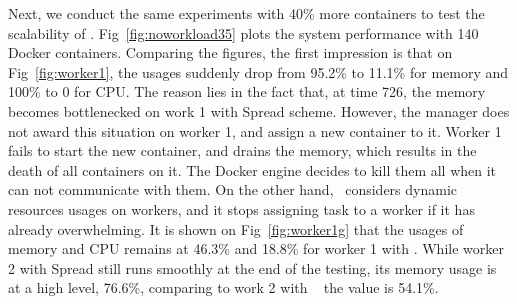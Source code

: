 Next, we conduct the same experiments with 40\% more containers to test the scalability of \sol.
Fig~\ref{fig:noworkload35} plots the system performance with 140 Docker containers. Comparing the figures, the first impression is that
on Fig~\ref{fig:worker1}, the usages suddenly drop from 95.2\% to 11.1\% for memory and 100\% to 0 for CPU.
The reason lies in the fact that, at time 726, the memory becomes bottlenecked on work 1 with Spread scheme.
However, the manager does not award this situation on worker 1, and assign a new container to it. Worker 1 fails to 
start the new container, and drains the memory, which results in the death of all containers on it. The Docker engine
decides to kill them all when it can not communicate with them. 
On the other hand, \sol~considers dynamic resources usages on workers, and it stops assigning task to a worker if it has already overwhelming.
It is shown on Fig~\ref{fig:worker1g} that the usages of memory and CPU remains at 46.3\% and 18.8\% for worker 1 with \sol.
While worker 2 with Spread still runs smoothly at the end of the testing, its memory usage is at a high level, 76.6\%, comparing to work 2 with \sol~
the value is 54.1\%. 


